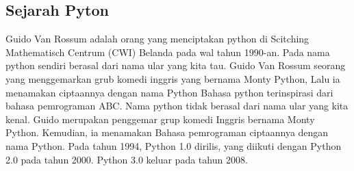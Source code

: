 \subsection{Sejarah Pyton}
Guido Van Rossum adalah orang yang menciptakan python di Scitching Mathematisch Centrum (CWI) Belanda pada wal tahun 1990-an. 
Pada nama python sendiri berasal dari nama ular yang kita tau. Guido Van Rossum seorang yang menggemarkan grub komedi inggris yang bernama Monty Python, Lalu ia menamakan ciptaannya dengan nama Python
Bahasa python terinspirasi dari bahasa pemrograman ABC. Nama python tidak berasal dari nama ular yang kita kenal. Guido merupakan penggemar grup komedi Inggris bernama Monty Python. Kemudian, ia menamakan Bahasa pemrograman ciptaannya dengan nama Python.
Pada tahun 1994, Python 1.0 dirilis, yang diikuti dengan Python 2.0 pada tahun 2000. Python 3.0 keluar pada tahun 2008.

